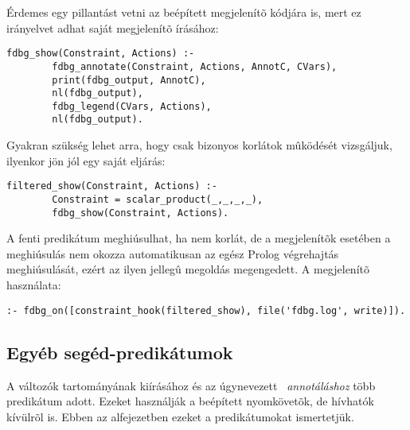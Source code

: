 Érdemes egy pillantást vetni az  beépített megjelenítõ kódjára is,
mert ez irányelvet adhat saját megjelenítõ írásához:

\begin{verbatim}
fdbg_show(Constraint, Actions) :-
        fdbg_annotate(Constraint, Actions, AnnotC, CVars),
        print(fdbg_output, AnnotC),
        nl(fdbg_output),
        fdbg_legend(CVars, Actions),
        nl(fdbg_output).
\end{verbatim}

Gyakran szükség lehet arra, hogy csak bizonyos korlátok mûködését vizsgáljuk,
ilyenkor jön jól egy saját  eljárás:

\begin{verbatim}
filtered_show(Constraint, Actions) :-
        Constraint = scalar_product(_,_,_,_),
        fdbg_show(Constraint, Actions).
\end{verbatim}

A fenti predikátum meghiúsulhat, ha  nem  korlát,
de a megjelenítõk esetében a meghiúsulás nem okozza automatikusan az egész Prolog
végrehajtás meghiúsulását, ezért az ilyen jellegû megoldás megengedett. A
megjelenítõ használata:

\begin{verbatim}
:- fdbg_on([constraint_hook(filtered_show), file('fdbg.log', write)]).
\end{verbatim}

\subsection{Egyéb segéd-predikátumok}

A változók tartományának kiírásához és az úgynevezett ~\emph{annotáláshoz} több
predikátum adott.  Ezeket használják a beépített nyomkövetõk, de hívhatók
kívülrõl is. Ebben az alfejezetben ezeket a predikátumokat ismertetjük.

